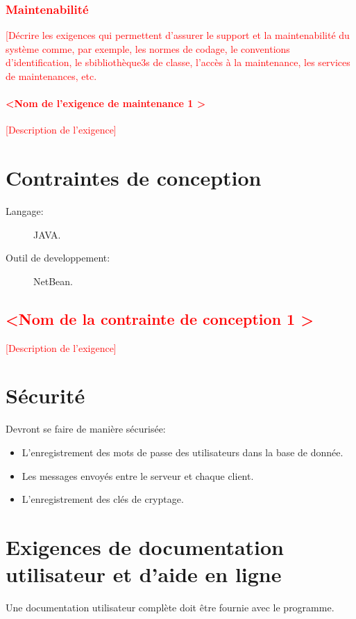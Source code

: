 \documentclass[10pt,a4paper]{report}
\begin{document}
\textcolor{red}{\subsubsection{Maintenabilité}
[Décrire les exigences qui permettent d’assurer le support et la maintenabilité du système comme, par exemple, les normes de codage, le conventions d’identification, le sbibliothèque3s de classe, l’accès à la maintenance, les services de maintenances, etc. 
\paragraph{\textless Nom de l’exigence de maintenance 1 \textgreater}
[Description de l’exigence]}


\section{Contraintes de conception}
\begin{description}
\item[Langage:] JAVA.
\item[Outil de developpement:] NetBean.
\end{description}
\textcolor{red}{\subsection{\textless Nom de la contrainte de conception 1 \textgreater}
[Description de l’exigence]}


\section{Sécurité}
Devront se faire de manière sécurisée:
\begin{itemize}
\item L'enregistrement des mots de passe des utilisateurs dans la base de donnée.
\item Les messages envoyés entre le serveur et chaque client.
\item L'enregistrement des clés de cryptage.
\end{itemize}



\section{Exigences de documentation utilisateur et d’aide en ligne}
Une documentation utilisateur complète doit être fournie avec le programme.
\end{document}
